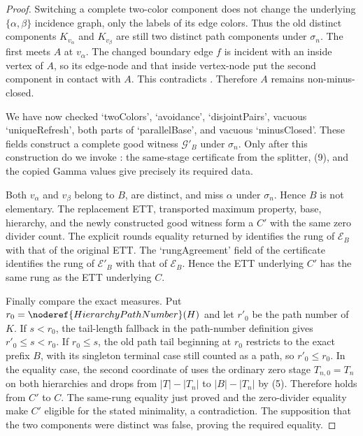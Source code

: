 \begin{proof}
Switching a complete two-color component does not change the underlying
$\{\alpha,\beta\}$ incidence graph, only the labels of its edge colors.
Thus the old distinct components $K_{v_\alpha}$ and $K_{v_\beta}$ are still
two distinct path components under $\sigma_n$.  The first meets $A$ at
$v_\alpha$.  The changed boundary edge $f$ is incident with an inside
vertex of $A$, so its edge-node and that inside vertex-node put the second
component in contact with $A$.  This contradicts
.  Therefore $A$ remains non-minus-closed.

We have now checked `twoColors', `avoidance', `disjointPairs', vacuous
`uniqueRefresh', both parts of `parallelBase', and vacuous `minusClosed'.
These fields construct a complete good witness $\mathcal G'_B$ under
$\sigma_n$.  Only after this construction do we invoke
: the same-stage certificate from the splitter,
(9), and the copied Gamma values give precisely its required data.

Both $v_\alpha$ and $v_\beta$ belong to $B$, are distinct, and miss
$\alpha$ under $\sigma_n$.  Hence $B$ is not elementary.  The replacement
ETT, transported maximum property, base, hierarchy, and the newly constructed
good witness form a  $C'$ with the same
zero divider count.  The explicit rounds equality returned by
 identifies the rung of
$\mathcal E_B$ with that of the original ETT.  The `rungAgreement' field
of the  certificate identifies
the rung of $\mathcal E'_B$ with that of $\mathcal E_B$.  Hence the ETT
underlying $C'$ has the same rung as the ETT underlying $C$.

Finally compare the exact measures.  Put
$r_0=\noderef{HierarchyPathNumber}(H)$ and let $r'_0$ be the path number of
$K$.  If $s<r_0$, the tail-length fallback in the path-number definition
gives $r'_0\leq s<r_0$.  If $r_0\leq s$, the old path tail beginning at
$r_0$ restricts to the exact prefix $B$, with its singleton terminal case
still counted as a path, so $r'_0\leq r_0$.  In the
equality case, the second coordinate of
 uses the ordinary zero stage
$T_{n,0}=T_n$ on both hierarchies and drops from
$|T|-|T_n|$ to $|B|-|T_n|$ by (5).  Therefore
 holds from $C'$ to $C$.  The
same-rung equality just proved and the zero-divider equality make $C'$
eligible for the stated minimality, a contradiction.  The supposition
that the two components were
distinct was false, proving the required equality.
\end{proof}
